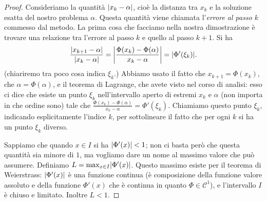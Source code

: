 \documentclass[a4paper]{report}
\DeclarePairedDelimiter{\abs}{\lvert}{\rvert}
\theoremstyle{definiton}
\theoremstyle{remark}
\begin{document}

\begin{proof}
Consideriamo la quantità $\abs{x_k-\alpha}$, cioè la distanza tra $x_k$ e la soluzione esatta del nostro problema $\alpha$. Questa quantità viene chiamata l'\emph{errore al passo $k$} commesso dal metodo. La prima cosa che facciamo nella nostra dimostrazione è trovare una relazione tra l'errore al passo $k$ e quello al passo $k+1$. Si ha
\[
\frac{\abs{x_{k+1}-\alpha}}{\abs{x_k-\alpha}} = \abs*{
    \frac{\Phi(x_k)-\Phi(\alpha)}{x_k-\alpha}} = \abs{\Phi'(\xi_k)}.
\]
(chiariremo tra poco cosa indica $\xi_k$.) Abbiamo usato il fatto che $x_{k+1} = \Phi(x_k)$, che $\alpha = \Phi(\alpha)$, e il teorema di Lagrange, che avete visto nel corso di analisi: esso ci dice che esiste un punto $\xi_k$ nell'intervallo aperto di estremi $x_k$ e $\alpha$ (non importa in che ordine sono) tale che $\frac{\Phi(x_k)-\Phi(\alpha)}{x_k-\alpha} = \Phi'(\xi_k)$. Chiamiamo questo punto $\xi_k$, indicando esplicitamente l'indice $k$, per sottolineare il fatto che per ogni $k$ si ha un punto $\xi_k$ diverso.

Sappiamo che quando $x\in I$ si ha $\abs{\Phi'(x)}<1$; non ci basta però che questa quantità sia minore di $1$, ma vogliamo dare un nome al massimo valore che può assumere. Definiamo $L = \max_{x\in I} \abs{\Phi'(x)}$. Questo massimo esiste per il teorema di Weierstrass: $\abs{\Phi'(x)}$ è una funzione continua (è composizione della funzione valore assoluto e della funzione $\Phi'(x)$ che è continua in quanto $\Phi \in \mathcal{C}^1$), e l'intervallo $I$ è chiuso e limitato. Inoltre $L<1$.


\end{proof}
\end{document}
